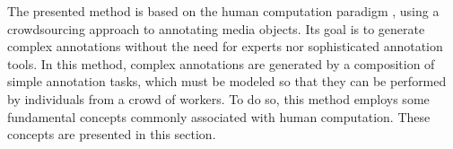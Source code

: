 The presented method is based on the human computation paradigm \citep{VonAhn:2005:HC:1168246}, using a crowdsourcing approach \citep{Howe2006} to annotating media objects. Its goal is to generate complex annotations without the need for experts nor sophisticated annotation tools. In this method, complex annotations are generated by a composition of simple annotation tasks, which must be modeled so that they can be performed by individuals from a crowd of workers. To do so, this method employs some fundamental concepts commonly associated with human computation. These concepts are presented in this section.

